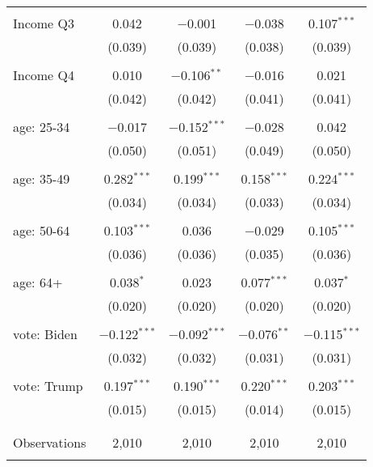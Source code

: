 \begin{tabular}{@{\extracolsep{5pt}}lcccc}
  & & & & \\ 
 Income Q3 & 0.042 & $-$0.001 & $-$0.038 & 0.107$^{***}$ \\ 
  & (0.039) & (0.039) & (0.038) & (0.039) \\ 
  & & & & \\ 
 Income Q4 & 0.010 & $-$0.106$^{**}$ & $-$0.016 & 0.021 \\ 
  & (0.042) & (0.042) & (0.041) & (0.041) \\ 
  & & & & \\ 
 age: 25-34 & $-$0.017 & $-$0.152$^{***}$ & $-$0.028 & 0.042 \\ 
  & (0.050) & (0.051) & (0.049) & (0.050) \\ 
  & & & & \\ 
 age: 35-49 & 0.282$^{***}$ & 0.199$^{***}$ & 0.158$^{***}$ & 0.224$^{***}$ \\ 
  & (0.034) & (0.034) & (0.033) & (0.034) \\ 
  & & & & \\ 
 age: 50-64 & 0.103$^{***}$ & 0.036 & $-$0.029 & 0.105$^{***}$ \\ 
  & (0.036) & (0.036) & (0.035) & (0.036) \\ 
  & & & & \\ 
 age: 64+ & 0.038$^{*}$ & 0.023 & 0.077$^{***}$ & 0.037$^{*}$ \\ 
  & (0.020) & (0.020) & (0.020) & (0.020) \\ 
  & & & & \\ 
 vote: Biden & $-$0.122$^{***}$ & $-$0.092$^{***}$ & $-$0.076$^{**}$ & $-$0.115$^{***}$ \\ 
  & (0.032) & (0.032) & (0.031) & (0.031) \\ 
  & & & & \\ 
 vote: Trump & 0.197$^{***}$ & 0.190$^{***}$ & 0.220$^{***}$ & 0.203$^{***}$ \\ 
  & (0.015) & (0.015) & (0.014) & (0.015) \\ 
  & & & & \\ 
\hline \\[-1.8ex] 

Observations & 2,010 & 2,010 & 2,010 & 2,010 \\ 
\hline 
\hline \\[-1.8ex] 
\end{tabular} 